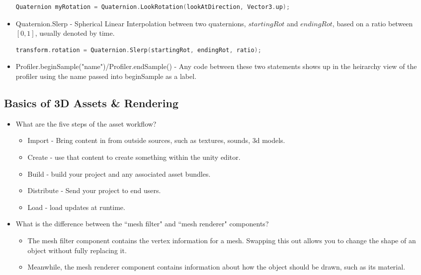 \documentclass{article}
\begin{document}
\begin{itemize}
    \begin{lstlisting}[language=C++]
                Quaternion myRotation = Quaternion.LookRotation(lookAtDirection, Vector3.up); \end{lstlisting}
    \item Quaternion.Slerp - Spherical Linear Interpolation between two quaternions, $startingRot$ and $endingRot$, based on a ratio between $[0,1]$, usually denoted by time.
    \begin{lstlisting}[language=C++]
                transform.rotation = Quaternion.Slerp(startingRot, endingRot, ratio); \end{lstlisting}
    \item Profiler.beginSample("name")/Profiler.endSample() - Any code between these two statements shows up in the heirarchy view of the profiler using the name passed into beginSample as a label. 
\end{itemize}

\subsection{Basics of 3D Assets \& Rendering}
\begin{itemize}
    \item What are the five steps of the asset workflow?
    \begin{itemize}
        \item Import - Bring content in from outside sources, such as textures, sounds, 3d models.
        \item Create - use that content to create something within the unity editor.
        \item Build - build your project and any associated asset bundles.
        \item Distribute - Send your project to end users.
        \item Load - load updates at runtime.
    \end{itemize}
    \item What is the difference between the ``mesh filter" and ``mesh renderer" components?
    \begin{itemize}
        \item The mesh filter component contains the vertex information for a mesh. Swapping this out allows you to change the shape of an object without fully replacing it.
        \item Meanwhile, the mesh renderer component contains information about how the object should be drawn, such as its material.
    \end{itemize}
\end{itemize}
\end{document}
